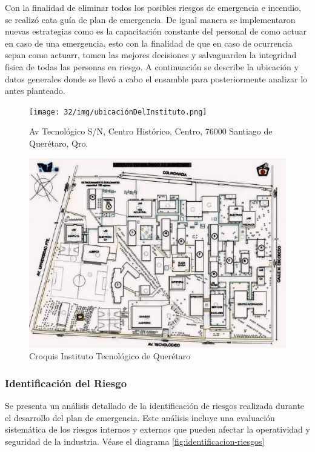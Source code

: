     Con la finalidad de eliminar todos los posibles riesgos de emergencia e incendio, se realizó eata guía de plan de emergencia. De igual manera se implementaron nuevas estrategias como es la capacitación constante del personal de como actuar en caso de una emergencia, esto con la finalidad de que en caso de ocurrencia sepan como actuarr, tomen las mejores decisiones y salvaguarden la integridad fisica de todas las personas en riesgo. 
    A continuación se describe la ubicación y datos generales donde se llevó a cabo el ensamble para posteriormente analizar lo antes planteado.
    \begin{figure}[H]
        \centering
        \texttt{[image: 32/img/ubicaciónDelInstituto.png]}
        \caption{Av Tecnológico S/N, Centro Histórico, Centro, 76000 Santiago de Querétaro, Qro.}
        \label{fig:enter-label}
    \end{figure}
    \begin{figure}[H]
        \centering
        \includegraphics[scale=0.2]{32/img/croquisITQ.jpg}
        \caption{Croquis Instituto Tecnológico de Querétaro}
        \label{fig:enter-label}
    \end{figure}
    \subsubsection{Identificación del Riesgo}
    Se presenta un análisis detallado de la identificación de riesgos realizada durante el desarrollo del plan de emergencia. Este análisis incluye una evaluación sistemática de los riesgos internos y externos que pueden afectar la operatividad y seguridad de la industria. Véase el diagrama  \ref{fig:identificacion-riesgos}


